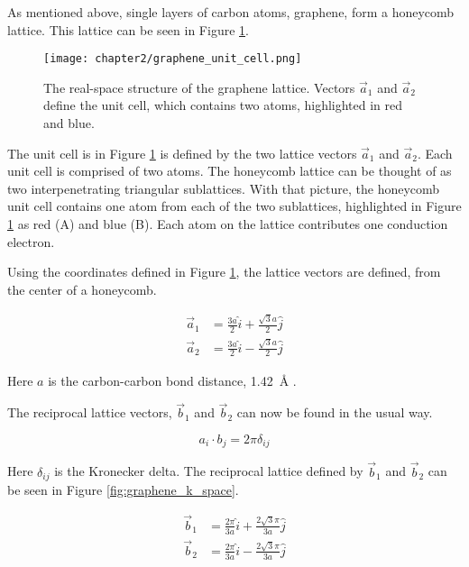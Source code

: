 As mentioned above, single layers of carbon atoms, graphene, form a honeycomb lattice. This lattice can be seen in Figure \ref{fig:graphene_unit_cell}.

\begin{figure}
    \centering
    \texttt{[image: chapter2/graphene\_unit\_cell.png]}
    \caption{The real-space structure of the graphene lattice. Vectors $\vec{a}_1$ and $\vec{a}_2$ define the unit cell, which contains two atoms, highlighted in red and blue.}
    \label{fig:graphene_unit_cell}
\end{figure}

The unit cell is in Figure \ref{fig:graphene_unit_cell} is defined by the two lattice vectors $\vec{a}_1$ and $\vec{a}_2$. Each unit cell is comprised of two atoms. The honeycomb lattice can be thought of as two interpenetrating triangular sublattices. With that picture, the honeycomb unit cell contains one atom from each of the two sublattices, highlighted in Figure \ref{fig:graphene_unit_cell} as red (A) and blue (B). Each atom on the lattice contributes one conduction electron.

Using the coordinates defined in Figure \ref{fig:graphene_unit_cell}, the lattice vectors are defined, from the center of a honeycomb.

\begin{align}
    \vec{a}_1 &= \frac{3a}{2}\hat{i} + \frac{\sqrt{3}a}{2}\hat{j} \\
    \vec{a}_2 &= \frac{3a}{2}\hat{i} - \frac{\sqrt{3}a}{2}\hat{j}
\end{align}

Here $a$ is the carbon-carbon bond distance, \SI{1.42}{\angstrom} \cite{Javey2009}.

The reciprocal lattice vectors, $\vec{b}_1$ and $\vec{b}_2$ can now be found in the usual way.

\begin{equation}
    a_i \cdot b_j = 2\pi \delta_{ij}
\end{equation}

Here $\delta_{ij}$ is the Kronecker delta. The reciprocal lattice defined by $\vec{b}_1$ and $\vec{b}_2$ can be seen in Figure \ref{fig:graphene_k_space}.

\begin{align}
    \vec{b}_1 &= \frac{2\pi}{3a}\hat{i} + \frac{2\sqrt{3}\pi}{3a}\hat{j} \\
    \vec{b}_2 &= \frac{2\pi}{3a}\hat{i} - \frac{2\sqrt{3}\pi}{3a}\hat{j}
\end{align}

